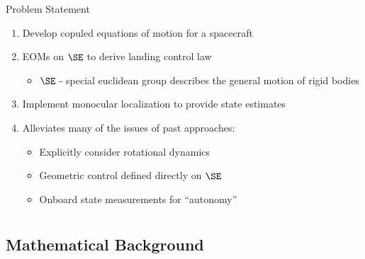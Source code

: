 \documentclass[11pt,professionalfonts]{beamer}
\begin{document}
\begin{frame}{Problem Statement}
    \begin{enumerate}
        \item Develop copuled equations of motion for a spacecraft
        \item EOMs on \( \SE \) to derive landing control law
            \begin{itemize}
                \item \( \SE \) - special euclidean group describes the general motion of rigid bodies
            \end{itemize}
        \item Implement monocular localization to provide state estimates
        \item Alleviates many of the issues of past approaches:
            \pause
            \begin{itemize}
                \item Explicitly consider rotational dynamics
                \item Geometric control defined directly on \( \SE \)
                \item Onboard state measurements for ``autonomy''
            \end{itemize}
    \end{enumerate}
\end{frame}
\section*{}
\subsection*{Mathematical Background}
\end{document}
